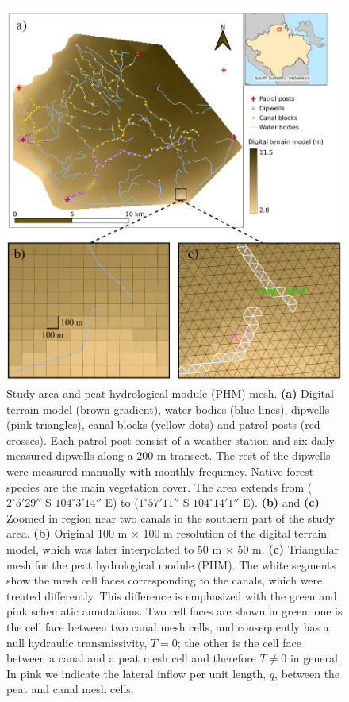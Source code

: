\documentclass[bg, manuscript]{copernicus}
\begin{document}
\begin{figure}[H]
\includegraphics[width=12 cm]{figs/area+zoominDTM.pdf}
\caption{Study area and peat hydrological module (PHM) mesh. \textbf{(a)} Digital terrain model (brown gradient), water bodies (blue lines), dipwells (pink triangles), canal blocks (yellow dots) and patrol posts (red crosses). Each patrol post consist of a weather station and six daily measured  dipwells along a 200 \unit{m} transect. The rest of the dipwells were measured manually with monthly frequency. Native forest species are the main vegetation cover. The area extends from ($2^\circ 5' 29''$ S $104^\circ 3' 14''$ E) to ($1^\circ 57' 11''$ S $104^\circ 14' 1''$ E). \textbf{(b)} and \textbf{(c)} Zoomed in region near two canals in the southern part of the study area. \textbf{(b)} Original 100 \unit{m} $\times$ 100 \unit{m} resolution of the digital terrain model, which was later interpolated to 50 \unit{m} $\times$ 50 \unit{m}. \textbf{(c)} Triangular mesh for the peat hydrological module (PHM). The white segments show the mesh cell faces corresponding to the canals, which were treated differently. This difference is emphasized with the green and pink schematic annotations. Two cell faces are shown in green: one is the cell face between two canal mesh cells, and consequently has a null hydraulic transmissivity, $T=0$; the other is the cell face between a canal and a peat mesh cell and therefore $T\neq0$ in general. In pink we indicate the lateral inflow per unit length, $q$, between the peat and canal mesh cells.}
\label{fig:study_area}
\end{figure}   
\end{document}
